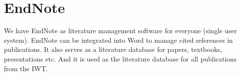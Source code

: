 \section{EndNote}

We have EndNote as literature management software for everyone (single user
system). EndNote can be integrated into Word to manage cited references in
publications. It also serves as a literature database for papers, textbooks,
presentations etc. And it is used as the literature database for all
publications from the IWT.
